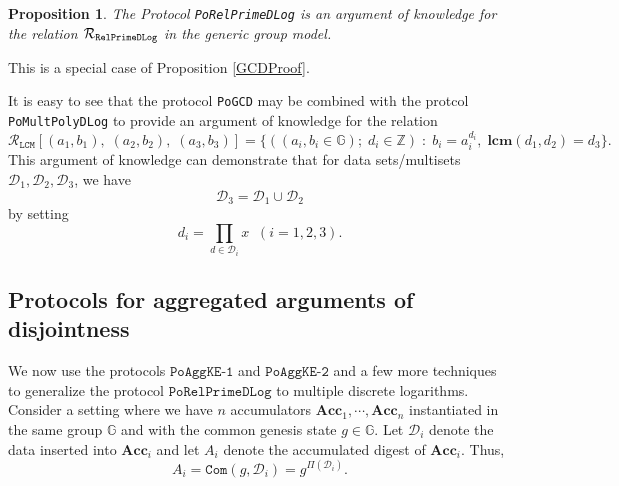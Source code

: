 \documentclass[11pt, lettersize, notitlepage, leqno, footskip=0.6cm]{article}
\newcommand{\bz}{\mathbb Z}
\newcommand{\ttt}{\texttt}
\newcommand{\Acc}{\mbf{Acc}}
\newcommand{\mc}{\mathcal}
\newcommand{\mb}{\mathbb}
\newcommand{\mbf}{\mathbf}
\newcommand{\vs}{\vspace{-0.15cm}}
\newcommand{\noin}{\noindent}
\newcommand{\LCM}{\mbf{lcm}}
\newtheorem{Prop}[Thm]{Proposition}
\numberwithin{equation}{section}
\begin{document}
\begin{Prop} The Protocol \verb|PoRelPrimeDLog| is an argument of knowledge for the relation $\mc{R}_{{\tt{RelPrimeDLog}}}$ in the generic group model.\end{Prop}

\begin{prf} This is a special case of Proposition \ref{GCDProof}.\end{prf}



It is easy to see that the protocol \verb|PoGCD| may be combined with the protcol \verb|PoMultPolyDLog| to provide an argument of knowledge for the relation 
\[ \mc{R}_{{\ttt{LCM}}}[(a_1,b_1),\;(a_2,b_2), \; (a_3, b_3)] = \{((a_i, b_i\in\mb{G});\;d_i\in\bz)\;:\; b_i = a_i^{d_i},\;\LCM(d_1,d_2)=d_3 \} .\] This argument of knowledge can demonstrate that for data sets/multisets $\mc{D}_1,\mc{D}_2, \mc{D}_3$, we have \vs $$\mc{D}_3 = \mc{D}_1\cup \mc{D}_2 $$ by setting \vs $$ d_i = \prod\limits_{d\in\mc{D}_i} x\;\;(i=1,2,3).$$







\subsection{\fontsize{11}{11}\selectfont Protocols for aggregated arguments of disjointness}

We now use the protocols \hyperlink{AggKE-1}{$\ttt{PoAggKE-1}$} and \hyperlink{AggKE-2}{$\ttt{PoAggKE-2}$} and a few more techniques to generalize the protocol \hyperlink{RP}{$\ttt{PoRelPrimeDLog}$} to multiple discrete logarithms. Consider a setting where we have $n$ accumulators $\Acc_1,\cdots,\Acc_n$ instantiated in the same group $\mb{G}$ and with the common genesis state $g\in\mb{G}$. Let $\mc{D}_i$ denote the data inserted into $\Acc_i$ and let $A_i$ denote the accumulated digest of $\Acc_i$. Thus, \vs $$A_i = \ttt{Com}(g, \mc{D}_i) =  g^{\Pi(\mc{D}_i)} .$$ 
\end{document}
